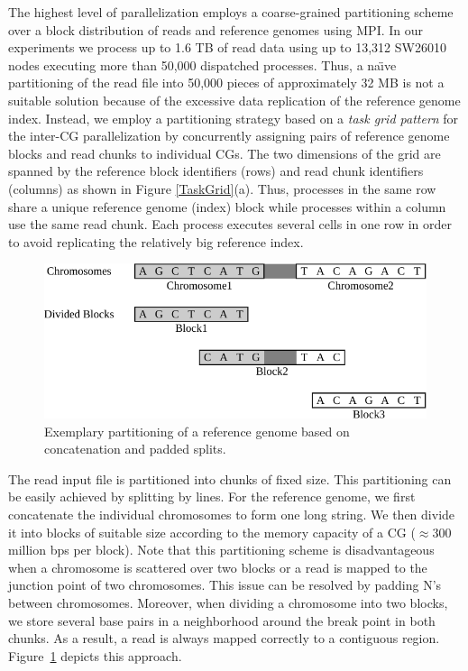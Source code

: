 The highest level of parallelization employs a coarse-grained
partitioning scheme over a block distribution of reads and reference
genomes using MPI. In our experiments we process up to 1.6 TB of read
data using up to 13,312 SW26010 nodes executing more than 50,000
dispatched processes. Thus, a na\"{\i}ve partitioning of the read file
into 50,000 pieces of approximately 32 MB is not a suitable
solution because of the excessive data replication of the reference
genome index. Instead, we employ a partitioning strategy based on a
{\em task grid pattern} for the inter-CG parallelization by
concurrently assigning pairs of reference genome blocks and read
chunks to individual CGs. The two dimensions of the grid are spanned
by the reference block identifiers (rows) and read chunk identifiers
(columns) as shown in Figure \ref{TaskGrid}(a). Thus, processes in the
same row share a unique reference genome (index) block while processes
within a column use the same read chunk. Each process executes several
cells in one row in order to avoid replicating the relatively big
reference index.

\begin{figure}[!htb]
  \begin{center}
    \includegraphics[width=0.9\linewidth]{figures/RefDiv}
    \caption{Exemplary partitioning of a reference genome based on
      concatenation and padded splits.}
    \label{RefDiv}
  \end{center}
\end{figure}

The read input file is partitioned into chunks of fixed size. This partitioning can
be easily achieved by splitting by lines. For the reference genome, we
first concatenate the individual chromosomes to form one long
string. We then divide it into blocks of suitable size according to
the memory capacity of a CG ($\approx$300 million bps per block). Note
that this partitioning scheme is disadvantageous when a chromosome is
scattered over two blocks or a read is mapped to the junction point of
two chromosomes. This issue can be resolved by padding N's between
chromosomes. Moreover, when dividing a chromosome into two blocks, we
store several base pairs in a neighborhood around the break point in
both chunks. As a result, a read is always mapped correctly to a
contiguous region. Figure~\ref{RefDiv} depicts this approach.

